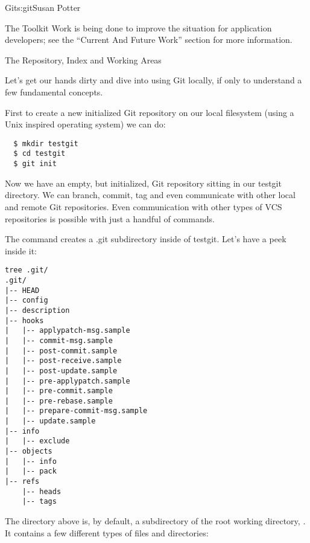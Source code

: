 \begin{aosachapter}{Git}{s:git}{Susan Potter}
\begin{aosasect1}{The Toolkit}
Work is being done to improve the situation for application developers; see
the ``Current And Future Work'' section for more information.
\end{aosasect1}

\begin{aosasect1}{The Repository, Index and Working Areas}

Let's get our hands dirty and dive into using Git locally, if only to
understand a few fundamental concepts.

First to create a new initialized Git repository on our local filesystem
(using a Unix inspired operating system) we can do:
\begin{verbatim}
  $ mkdir testgit
  $ cd testgit
  $ git init
\end{verbatim}

Now we have an empty, but initialized, Git repository sitting in our testgit
directory. We can branch, commit, tag and even communicate with other local
and remote Git repositories. Even communication with other types of VCS
repositories is possible with just a handful of  commands.

The  command creates a .git subdirectory inside of testgit.
Let's have a peek inside it:
\begin{verbatim}
tree .git/
.git/
|-- HEAD
|-- config
|-- description
|-- hooks
|   |-- applypatch-msg.sample
|   |-- commit-msg.sample
|   |-- post-commit.sample
|   |-- post-receive.sample
|   |-- post-update.sample
|   |-- pre-applypatch.sample
|   |-- pre-commit.sample
|   |-- pre-rebase.sample
|   |-- prepare-commit-msg.sample
|   |-- update.sample
|-- info
|   |-- exclude
|-- objects
|   |-- info
|   |-- pack
|-- refs
    |-- heads
    |-- tags
\end{verbatim}

The  directory above is, by default, a subdirectory of the root working
directory, . It contains a few different types of files and
directories:


\end{aosasect1}
\end{aosachapter}
